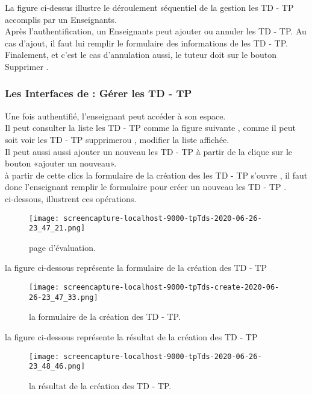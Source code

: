 La figure ci-dessus illustre le déroulement séquentiel de la gestion les  TD  -  TP accomplis par un
Enseignants.\\
Après l’authentification, un Enseignants peut ajouter ou annuler les  TD  -  TP. Au cas d’ajout, il faut lui
 remplir le formulaire  des informations de les  TD  -  TP.\\
Finalement, et c’est le cas d’annulation aussi, le tuteur doit sur le bouton Supprimer .
\clearpage


\subsubsection{Les Interfaces de :  Gérer les  TD  -  TP  }
Une fois authentifié,  l'enseignant peut accéder à son espace. \\ 
Il peut consulter la liste  les  TD  -  TP comme la figure suivante
, comme il peut soit voir les  TD  -  TP  supprimerou , modifier
 la liste affichée.  \\
Il peut aussi aussi ajouter un nouveau les  TD  -  TP à partir de  la clique sur le bouton «ajouter un nouveau».  \\
à partir de cette clics la formulaire de la création des les  TD  -  TP s'ouvre , il faut donc  l'enseignant remplir le formulaire  pour créer un nouveau les  TD  -  TP . \\
ci-dessous, illustrent ces opérations.
\medskip
\medskip
\medskip
\begin{figure}[ht]
	\centering
	\texttt{[image: screencapture-localhost-9000-tpTds-2020-06-26-23\_47\_21.png]}
	\caption{page d'évaluation.}
	\label{fig:page des TD  -  TP }
\end{figure}
\FloatBarrier
\clearpage
la figure ci-dessous représente la formulaire de la création des TD  -  TP
\begin{figure}[ht]
	\centering
	\texttt{[image: screencapture-localhost-9000-tpTds-create-2020-06-26-23\_47\_33.png]}
	\caption{la formulaire de la création des TD  -  TP.}
	\label{fig:la formulaire de la création des TD  -  TP }
\end{figure}
\FloatBarrier
la figure ci-dessous représente la résultat de la création des TD  -  TP
\begin{figure}[ht]
	\centering
	\texttt{[image: screencapture-localhost-9000-tpTds-2020-06-26-23\_48\_46.png]}
	\caption{la résultat de la création des TD  -  TP.}
	\label{fig:la résultat de la création des TD  -  TP}
\end{figure}
\FloatBarrier
\clearpage
